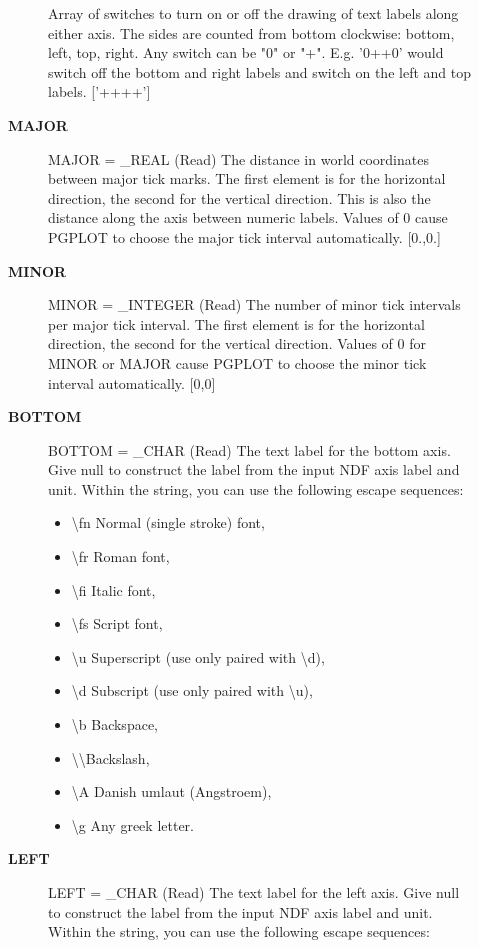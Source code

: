 \begin{description}
\begin{description}
   Array of switches to turn on or off the drawing of text labels
   along either axis. The sides are counted from bottom
   clockwise: bottom, left, top, right. Any switch can be
   "0" or "+". E.g. '0++0' would switch off the bottom and right
   labels and switch on the left and top labels. ['++++']
\item [\textbf{MAJOR}]
MAJOR = \_REAL (Read)
   The distance in world coordinates between major tick marks. The
   first element is for the horizontal direction, the second for
   the vertical direction. This is also the distance along the
   axis between numeric labels. Values of 0 cause PGPLOT to choose
   the major tick interval automatically. [0.,0.]
\item [\textbf{MINOR}]
MINOR = \_INTEGER (Read)
   The number of minor tick intervals per major tick interval. The
   first element is for the horizontal direction, the second for
   the vertical direction. Values of 0 for MINOR or MAJOR cause
   PGPLOT to choose the minor tick interval automatically. [0,0]
\item [\textbf{BOTTOM}]
BOTTOM = \_CHAR (Read)
   The text label for the bottom axis. Give null to construct the
   label from the input NDF axis label and unit. Within the string,
   you can use the following escape sequences:
\begin{itemize}
   \item  \textbackslash fn Normal (single stroke) font,
   \item  \textbackslash fr Roman font,
   \item  \textbackslash fi Italic font,
   \item  \textbackslash fs Script font,
   \item  \textbackslash u  Superscript (use only paired with \textbackslash d),
   \item  \textbackslash d  Subscript (use only paired with \textbackslash u),
   \item  \textbackslash b  Backspace,
   \item  \textbackslash \textbackslash   Backslash,
   \item  \textbackslash A  Danish umlaut (Angstroem),
   \item  \textbackslash g  Any greek letter.
\end{itemize}
\item [\textbf{LEFT}]
LEFT = \_CHAR (Read)
   The text label for the left axis. Give null to construct the
   label from the input NDF axis label and unit. Within the string,
   you can use the following escape sequences:

\end{description}
\end{description}
